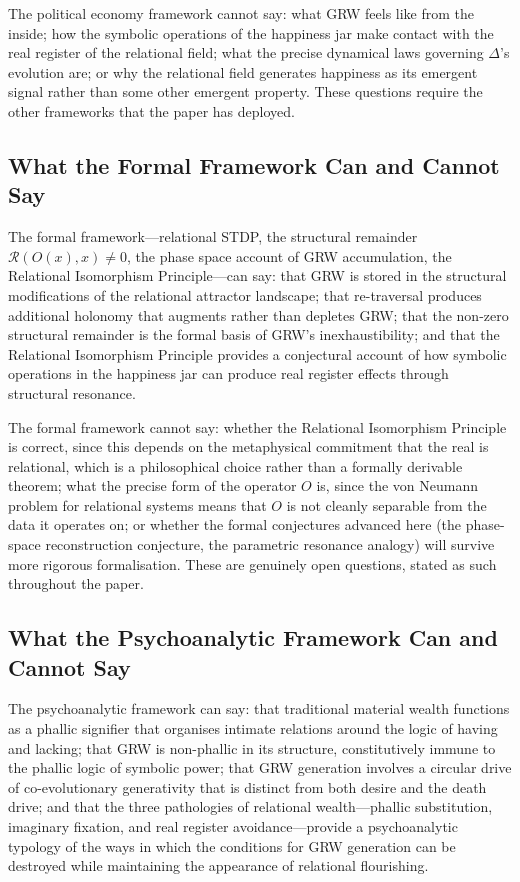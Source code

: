The political economy framework cannot say: what GRW feels like from the inside; how the symbolic operations of the happiness jar make contact with the real register of the relational field; what the precise dynamical laws governing $\Delta$'s evolution are; or why the relational field generates happiness as its emergent signal rather than some other emergent property. These questions require the other frameworks that the paper has deployed.

\subsection{What the Formal Framework Can and Cannot Say}
\label{p15:subsec:conc_formal}

\noindent
The formal framework---relational STDP, the structural remainder $\mathcal{R}(O(x), x) \neq 0$, the phase space account of GRW accumulation, the Relational Isomorphism Principle---can say: that GRW is stored in the structural modifications of the relational attractor landscape; that re-traversal produces additional holonomy that augments rather than depletes GRW; that the non-zero structural remainder is the formal basis of GRW's inexhaustibility; and that the Relational Isomorphism Principle provides a conjectural account of how symbolic operations in the happiness jar can produce real register effects through structural resonance.

The formal framework cannot say: whether the Relational Isomorphism Principle is correct, since this depends on the metaphysical commitment that the real is relational, which is a philosophical choice rather than a formally derivable theorem; what the precise form of the operator $O$ is, since the von Neumann problem for relational systems means that $O$ is not cleanly separable from the data it operates on; or whether the formal conjectures advanced here (the phase-space reconstruction conjecture, the parametric resonance analogy) will survive more rigorous formalisation. These are genuinely open questions, stated as such throughout the paper.

\subsection{What the Psychoanalytic Framework Can and Cannot Say}
\label{p15:subsec:conc_psycho}

\noindent
The psychoanalytic framework can say: that traditional material wealth functions as a phallic signifier that organises intimate relations around the logic of having and lacking; that GRW is non-phallic in its structure, constitutively immune to the phallic logic of symbolic power; that GRW generation involves a circular drive of co-evolutionary generativity that is distinct from both desire and the death drive; and that the three pathologies of relational wealth---phallic substitution, imaginary fixation, and real register avoidance---provide a psychoanalytic typology of the ways in which the conditions for GRW generation can be destroyed while maintaining the appearance of relational flourishing.

